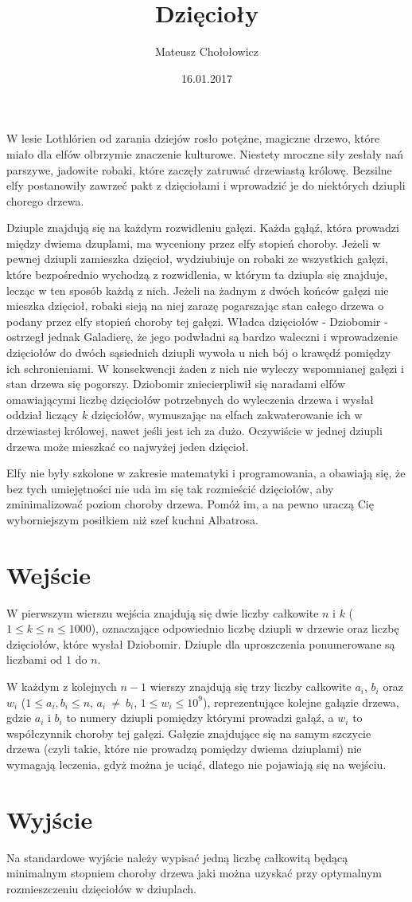 \documentclass[zad,zawodnik,utf8]{sinol}
\title{Dzięcioły}
\author{Mateusz Chołołowicz} %
\date{16.01.2017}
\begin{document}
\begin{tasktext}%
W lesie Lothl\'{o}rien od zarania dziejów rosło potężne, magiczne drzewo, które miało dla elfów olbrzymie znaczenie kulturowe. Niestety mroczne siły zesłały nań 
parszywe, jadowite robaki, które zaczęły zatruwać drzewiastą królowę. Bezsilne elfy postanowiły zawrzeć pakt z dzięciołami i wprowadzić je do niektórych dziupli
chorego drzewa. 

Dziuple znajdują się na każdym rozwidleniu gałęzi. Każda gąłąź, która prowadzi między dwiema dzuplami, ma wyceniony przez elfy stopień choroby.
Jeżeli w pewnej dziupli zamieszka dzięcioł, wydziubiuje on robaki ze wszystkich gałęzi, które bezpośrednio wychodzą z rozwidlenia, w którym ta dziupla się znajduje,
lecząc w ten sposób każdą z nich. Jeżeli na żadnym z dwóch końców gałęzi nie mieszka dzięcioł, robaki sieją na niej zarazę pogarszając stan całego drzewa
o podany przez elfy stopień choroby tej gałęzi. Władca dzięciołów - Dziobomir - ostrzegł jednak Galadierę, że jego podwładni są bardzo waleczni i wprowadzenie dzięciołów 
do dwóch sąsiednich dziupli wywoła u nich bój o krawędź pomiędzy ich schronieniami. W konsekwencji żaden z nich nie wyleczy wspomnianej gałęzi i stan drzewa się pogorszy.
Dziobomir zniecierpliwił się naradami elfów omawiającymi liczbę dzięciołów potrzebnych do wyleczenia drzewa i wysłał oddział liczący $k$ dzięciołów, 
wymuszając na elfach zakwaterowanie ich w drzewiastej królowej, nawet jeśli jest ich za dużo. Oczywiście w jednej dziupli drzewa może mieszkać co najwyżej jeden dzięcioł.

Elfy nie były szkolone w zakresie matematyki i programowania, a obawiają się, że bez tych umiejętności nie uda im się tak rozmieścić dzięciołów, aby zminimalizować
poziom choroby drzewa. Pomóż im, a na pewno uraczą Cię wyborniejszym posiłkiem niż szef kuchni Albatrosa. 

  \section{Wejście}
W pierwszym wierszu wejścia znajdują się dwie liczby całkowite $n$ i $k$ ($1 \leq k \leq n \leq 1000$), oznaczające odpowiednio liczbę dziupli w drzewie oraz 
liczbę dzięciołów, które wysłał Dziobomir. Dziuple dla uproszczenia ponumerowane są liczbami od $1$ do $n$.

W każdym z kolejnych $n-1$ wierszy znajdują się trzy liczby całkowite $a_i$, $b_i$ oraz $w_i$ ($1 \leq a_i, b_i \leq n$, $a_i~\neq~b_i$, $1 \leq w_i \leq 10^9$),
reprezentujące kolejne gałązie drzewa, gdzie $a_i$ i $b_i$ to numery dziupli pomiędzy którymi prowadzi gałąź, a $w_i$ to współczynnik choroby tej gałęzi.
Gałęzie znajdujące się na samym szczycie drzewa (czyli takie, które nie prowadzą pomiędzy dwiema dziuplami) nie wymagają leczenia, gdyż można je uciąć, dlatego
nie pojawiają się na wejściu.

 \section{Wyjście}
Na standardowe wyjście należy wypisać jedną liczbę całkowitą będącą minimalnym stopniem choroby drzewa jaki można uzyskać przy optymalnym rozmieszczeniu dzięciołów
w dziuplach.

\makecompactexample

\end{tasktext}
\end{document}

